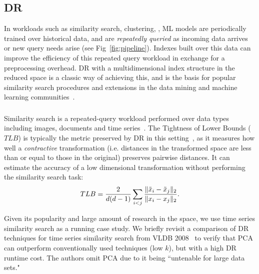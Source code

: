 \subsection{DR }

In workloads such as similarity search, clustering, , ML models are periodically trained over historical data, and are \emph{repeatedly queried} as incoming data arrives or new query needs arise (see Fig~\ref{fig:pipeline}). 
Indexes built over this data can improve the efficiency of this repeated query workload in exchange for a preprocessing overhead.
DR with a multidimensional index structure in the reduced space is a classic way of achieving this, and is the basis for popular similarity search procedures and extensions in the data mining and machine learning communities~\cite{local-dr,dynamic-ss,dm-book,humming-index,decade,search}.


\subsubsection*{}
Similarity search is a repeated-query workload performed over data types including images, documents and time series~\cite{keogh-study,lsh}.
The Tightness of Lower Bounds ($TLB$) is typically the metric preserved by DR in this setting~\cite{keogh-study}, as it measures how well a \emph{contractive} transformation (i.e. distances in the transformed space are less than or equal to those in the original) preserves pairwise distances. 
It can estimate the accuracy of a low dimensional transformation without performing the similarity search task:
\begin{equation}
\label{eq:tlb}
TLB = \frac{2}{{\color{black}d}({\color{black}d}-1)}\sum_{i<j}\frac{\| \tilde{x}_i -  \tilde{x}_j \|_2 }{\| x_i -  x_j\|_2 }.
\end{equation}

Given its popularity and large amount of research in the space, we use time series similarity search as a running case study. 
We briefly revisit a comparison of DR techniques for time series similarity search from VLDB 2008~\cite{keogh-study} to verify that PCA can outperform conventionally used techniques (low $k$), but with a high DR runtime cost.
The authors omit PCA due to it being ``untenable for large data sets." 

